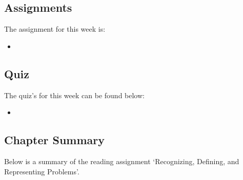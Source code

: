 \subsection{Assignments}

The assignment for this week is:

\begin{itemize}
    \item {}
\end{itemize}

\subsection{Quiz}

The quiz's for this week can be found below:

\begin{itemize}
    \item {}
\end{itemize}

\subsection{Chapter Summary}

Below is a summary of the reading assignment `Recognizing, Defining, and Representing Problems'.

